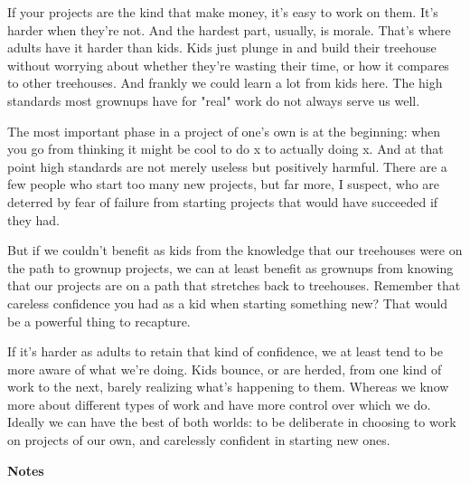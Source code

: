 If your projects
                  are the kind that make money, it's easy to work on them. It's
                  harder when they're not. And the hardest part, usually, is
                  morale. That's where adults have it harder than kids. Kids
                  just plunge in and build their treehouse without worrying
                  about whether they're wasting their time, or how it compares
                  to other treehouses. And frankly we could learn a lot from
                  kids here. The high standards most grownups have for "real"
                  work do not always serve us well.

The most
                  important phase in a project of one's own is at the beginning:
                  when you go from thinking it might be cool to do x to actually
                  doing x. And at that point high standards are not merely
                  useless but positively harmful. There are a few people who
                  start too many new projects, but far more, I suspect, who are
                  deterred by fear of failure from starting projects that would
                  have succeeded if they had.

But if we couldn't
                  benefit as kids from the knowledge that our treehouses were on
                  the path to grownup projects, we can at least benefit as
                  grownups from knowing that our projects are on a path that
                  stretches back to treehouses. Remember that careless
                  confidence you had as a kid when starting something new? That
                  would be a powerful thing to recapture.

If it's
                  harder as adults to retain that kind of confidence, we at
                  least tend to be more aware of what we're doing. Kids bounce,
                  or are herded, from one kind of work to the next, barely
                  realizing what's happening to them. Whereas we know more about
                  different types of work and have more control over which we
                  do. Ideally we can have the best of both worlds: to be
                  deliberate in choosing to work on projects of our own, and
                  carelessly confident in starting new ones.










                  \textbf{Notes}

